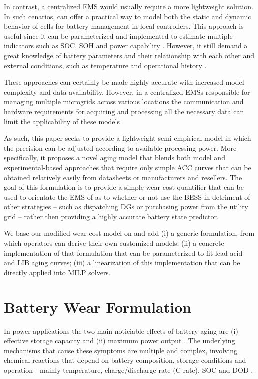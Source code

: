 \documentclass{ieeeaccess}
\begin{document}
    In contrast, a centralized \ac{EMS} would usually require a more lightweight solution. In such cenarios,  can offer a practical way to model both the static and dynamic behavior of cells for battery management in local controllers. This approach is useful since it can be parameterized and implemented to estimate multiple indicators such as \ac{SOC}, \ac{SOH} and power capability \cite{verbrugge2004adaptive, verbrugge2007adaptive}. However, it still demand a great knowledge of battery parameters and their relationship with each other and external conditions, such as temperature and operational history \cite{zhang2018online}.

    These approaches can certainly be made highly accurate with increased model complexity and data availability. However, in a centralized \acp{EMS} responsible for managing multiple microgrids across various locations the communication and hardware requirements for acquiring and processing all the necessary data can limit the applicability of these models \cite{DIMEASHATZIARGYRIOU2005}.

    As such, this paper seeks to provide a lightweight semi-empirical model in which the precision can be adjusted according to available processing power. More specifically, it proposes a novel aging model that blends both model and experimental-based approaches that require only simple \ac{ACC} curves that can be obtained relatively easily from datasheets or manufacturers and resellers. The goal of this formulation is to provide a simple wear cost quantifier that can be used to orientate the \ac{EMS} of  as to whether or not use the \ac{BESS} in detriment of other strategies -- such as dispatching \ac{DG}s or purchasing power from the utility grid -- rather then providing a highly accurate battery state predictor.

    We base our modified wear cost model on \cite{HAN2014} and add (i) a generic formulation, from which operators can derive their own customized models; (ii) a concrete implementation of that formulation that can be parameterized to fit lead-acid and \ac{LIB} aging curves; (iii) a linearization of this implementation that can be directly applied into \ac{MILP} solvers.

\section{Battery Wear Formulation}

    In power applications the two main noticiable effects of battery aging are (i) effective storage capacity and (ii) maximum power output \cite{han2014comparative, chemali2015minimizing, al2010mathematical}. The underlying mechanisms that cause these symptoms are multiple and complex, involving chemical reactions that depend on battery composition, storage conditions and operation - mainly temperature, charge/discharge rate (C-rate), \ac{SOC} and \ac{DOD} \cite{xiong2020lithium, vetter2005ageing, calearo2019modeling}.
\end{document}
